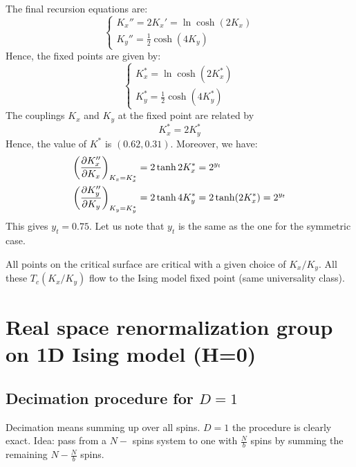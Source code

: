 \documentclass[../main/main.tex]{subfiles}
\begin{document}
The final recursion equations are:
\begin{equation}
  \begin{cases}
     K_x'' = 2 K_x' = \ln \cosh (2K_x) \\
       K_y'' = \frac{1}{2} \cosh (4K_y)
  \end{cases}
\end{equation}
Hence, the fixed points are given by:
\begin{equation}
  \begin{cases}
     K_x^* = \ln \cosh (2K_x^*) \\
       K_y^* = \frac{1}{2} \cosh (4K_y^*)
  \end{cases}
\end{equation}
The couplings \( K_x \) and \( K_y \) at the fixed point are related by
\begin{equation}
  K_x^* = 2 K_y^*
\end{equation}
Hence, the value of \( K^* \) is \( (0.62,0.31) \). Moreover, we have:
\begin{subequations}
\begin{align*}
  \qty(\pdv{K_x''}{K_x} )_{K_x=K_x^*}  &=  2 \tanh 2K_x^* = 2^{y_t} \\
  \qty(\pdv{K_y''}{K_y} )_{K_y=K_y^*}  &=  2 \tanh 4K_y^* =  2 \tanh (2K_x^*) =2^{y_t}
\end{align*}
\end{subequations}
This gives \( y_t = 0.75 \). Let us note that \( y_t \) is the same as the one for the symmetric case.


All points on the critical surface are critical with a given choice of \( K_x/K_y \). All these \( T_c (K_x/K_y) \) flow to the Ising model fixed point (same universality class).  








\section{Real space renormalization group on 1D Ising model (H=0)}


\subsection{Decimation procedure for \( D=1 \)}
Decimation means summing up over all spins.
\( D=1 \) the procedure is clearly exact. Idea: pass from a \( N- \) spins system to one with \( \frac{N}{b} \) spins by summing the remaining \( N- \frac{N}{b} \) spins.
\end{document}
